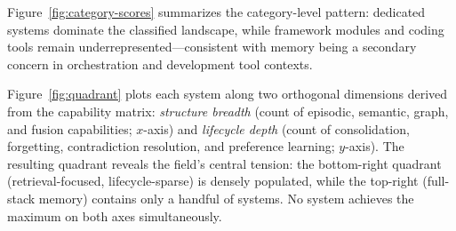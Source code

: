 Figure~\ref{fig:category-scores} summarizes the category-level pattern:
dedicated systems dominate the classified landscape, while framework modules
and coding tools remain underrepresented---consistent with memory being a
secondary concern in orchestration and development tool contexts.

Figure~\ref{fig:quadrant} plots each system along two orthogonal dimensions
derived from the capability matrix: \emph{structure breadth} (count of
episodic, semantic, graph, and fusion capabilities; $x$-axis) and
\emph{lifecycle depth} (count of consolidation, forgetting, contradiction
resolution, and preference learning; $y$-axis).  The resulting quadrant
reveals the field's central tension: the bottom-right quadrant
(retrieval-focused, lifecycle-sparse) is densely populated, while the
top-right (full-stack memory) contains only a handful of systems.
No system achieves the maximum on both axes simultaneously.

